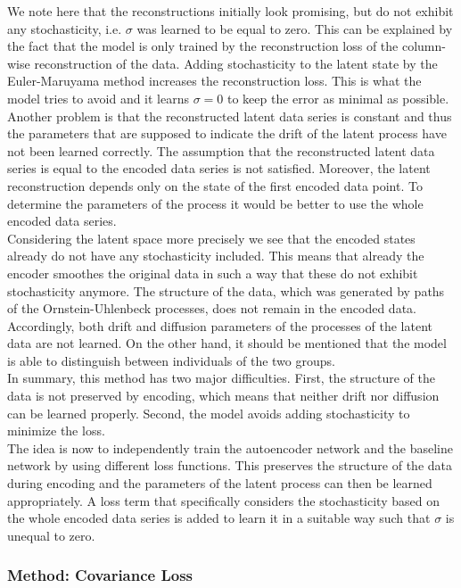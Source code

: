 \documentclass[11pt,titlepage]{article}
\theoremstyle{definition}
\theoremstyle{remark}
\begin{document}
	We note here that the reconstructions initially look promising, but do not exhibit any stochasticity, i.e. $\sigma$ was learned to be equal to zero. This can be explained by the fact that the model is only trained by the reconstruction loss of the column-wise reconstruction of the data. Adding stochasticity to the latent state by the Euler-Maruyama method increases the reconstruction loss. This is what the model tries to avoid and it learns $\sigma=0$ to keep the error as minimal as possible. Another problem is that the reconstructed latent data series is constant and thus the parameters that are supposed to indicate the drift of the latent process have not been learned correctly. The assumption that the reconstructed latent data series is equal to the encoded data series is not satisfied. Moreover, the latent reconstruction depends only on the state of the first encoded data point. To determine the parameters of the process it would be better to use the whole encoded data series.\\
	Considering the latent space more precisely we see that the encoded states already do not have any stochasticity included. This means that already the encoder smoothes the original data in such a way that these do not exhibit stochasticity anymore. The structure of the data, which was generated by paths of the Ornstein-Uhlenbeck processes, does not remain in the encoded data. Accordingly, both drift and diffusion parameters of the processes of the latent data are not learned. On the other hand, it should be mentioned that the model is able to distinguish between individuals of the two groups.\\
	In summary, this method has two major difficulties. First, the structure of the data is not preserved by encoding, which means that neither drift nor diffusion can be learned properly. Second, the model avoids adding stochasticity to minimize the loss. \\
	The idea is now to independently train the autoencoder network and the baseline network by using different loss functions. This preserves the structure of the data during encoding and the parameters of the latent process can then be learned appropriately. A loss term that specifically considers the stochasticity based on the whole encoded data series is added to learn it in a suitable way such that $\sigma$ is unequal to zero.
	\clearpage
	
	\subsubsection{Method: Covariance Loss}\label{sec res cov los}
	
\end{document}
